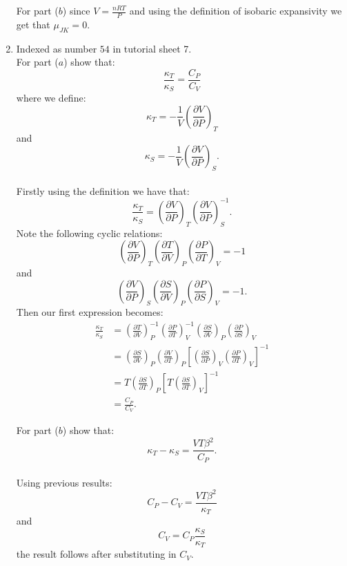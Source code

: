 \begin{enumerate}
    For part ($b$) since $V=\displaystyle\frac{nRT}{P}$ and using the definition of isobaric expansivity we get that $\mu_{JK}=0$.

    \newpage

    \item Indexed as number $54$ in tutorial sheet 7. \\
    
    For part ($a$) show that:
    $$\frac{\kappa_T}{\kappa_S}=\frac{C_P}{C_V}$$
    where we define:
    $$\kappa_T=-\frac{1}{V}
    \left(\frac{\partial V}{\partial P}\right)_T$$
    and
    $$\kappa_S=-\frac{1}{V}
    \left(\frac{\partial V}{\partial P}\right)_S.$$ \\

    Firstly using the definition we have that:
    $$\frac{\kappa_T}{\kappa_S}
    =\left(\frac{\partial V}{\partial P}\right)_T
    \left(\frac{\partial V}{\partial P}\right)_S^{-1}.$$
    Note the following cyclic relations:
    $$\left(\frac{\partial V}{\partial P}\right)_T
    \left(\frac{\partial T}{\partial V}\right)_P
    \left(\frac{\partial P}{\partial T}\right)_V=-1$$
    and
    $$\left(\frac{\partial V}{\partial P}\right)_S
    \left(\frac{\partial S}{\partial V}\right)_P
    \left(\frac{\partial P}{\partial S}\right)_V=-1.$$
    Then our first expression becomes:
    \begin{align*}
        \frac{\kappa_T}{\kappa_S}
        &=\left(\frac{\partial T}{\partial V}\right)_P^{-1}
        \left(\frac{\partial P}{\partial T}\right)_V^{-1}
        \left(\frac{\partial S}{\partial V}\right)_P
        \left(\frac{\partial P}{\partial S}\right)_V \\
        &=\left(\frac{\partial S}{\partial V}\right)_P
        \left(\frac{\partial V}{\partial T}\right)_P
        \left[\left(\frac{\partial S}{\partial P}\right)_V
        \left(\frac{\partial P}{\partial T}\right)_V
        \right]^{-1} \\
        &=T\left(\frac{\partial S}{\partial T}\right)_P
        \left[T\left(\frac{\partial S}{\partial T}\right)_V
        \right]^{-1} \\
        &=\frac{C_P}{C_V}.
    \end{align*}

    \newpage

    For part ($b$) show that:
    $$\kappa_T-\kappa_S=\frac{VT\beta^2}{C_P}.$$ \\

    Using previous results:
    $$C_P-C_V=\frac{VT\beta^2}{\kappa_T}$$
    and
    $$C_V=C_P\frac{\kappa_S}{\kappa_T}$$
    the result follows after substituting in $C_V$. \\


\end{enumerate}

